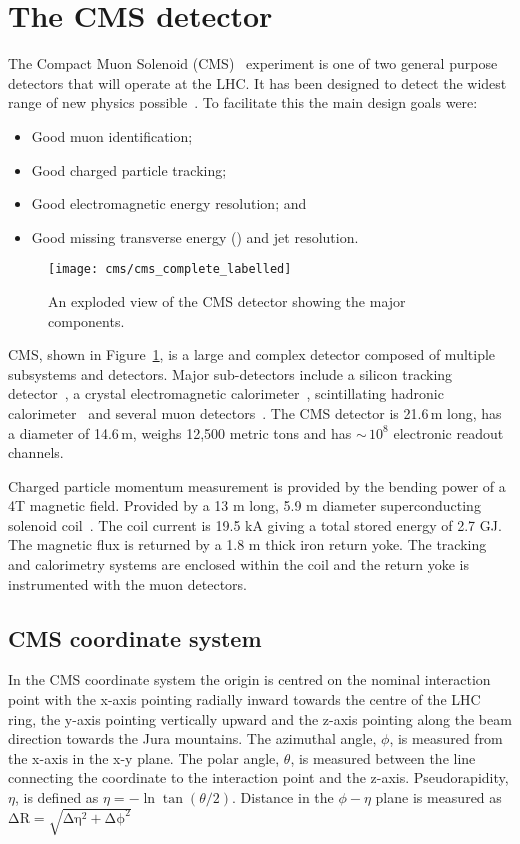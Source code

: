 \section{The CMS detector}
The Compact Muon Solenoid (CMS)~\cite{CMS_LOI,CMS_TP} experiment is one of two general purpose detectors that will operate at the LHC. It has been designed to detect the widest range of new physics possible~\cite{CMS_TDR_PHYS_vol1, CMS_TDR_PHYS_vol2}. To facilitate this the main design goals were:
\begin{itemize}
\item Good muon identification;
\item Good charged particle tracking;
\item Good electromagnetic energy resolution; and
\item Good missing transverse energy (\MET) and jet resolution.
\end{itemize}

\begin{figure}[!htb]
  \centering
  \texttt{[image: cms/cms\_complete\_labelled]}
  \caption{An exploded view of the CMS detector showing the major components.~\cite{CMS_TDR_PHYS_vol1}
  \label{fig:cms}}
\end{figure}

CMS, shown in Figure~\ref{fig:cms}, is a large and complex detector composed of multiple subsystems and detectors. Major sub-detectors include a silicon tracking detector~\cite{CMS_TRKTDR}, a crystal electromagnetic calorimeter~\cite{CMS_ECALTDR}, scintillating hadronic calorimeter~\cite{CMS_HCALTDR} and several muon detectors~\cite{CMS_MUONTDR}. The CMS detector is 21.6\,m long, has a diameter of 14.6\,m, weighs 12,500 metric tons and has $\sim\,10^{8}$ electronic readout channels. 

Charged particle momentum measurement is provided by the bending power of a 4T magnetic field. Provided by a 13 m long, 5.9 m diameter superconducting solenoid coil~\cite{CMS_MAGTDR}. The coil current is 19.5 kA giving a total stored energy of 2.7 GJ. The magnetic flux is returned by a 1.8 m thick iron return yoke. The tracking and calorimetry systems are enclosed within the coil and the return yoke is instrumented with the muon detectors.

\subsection{CMS coordinate system}
In the CMS coordinate system the origin is centred on the nominal interaction point with the x-axis pointing radially inward towards the centre of the LHC ring, the y-axis pointing vertically upward and the z-axis pointing along the beam direction towards the Jura mountains. The azimuthal angle, $\phi$, is measured from the x-axis in the x-y plane. The polar angle, $\theta$, is measured between the line connecting the coordinate to the interaction point and the z-axis. Pseudorapidity, $\eta$, is defined as $\eta=-\ln\tan(\theta/2)$. Distance in the $\phi - \eta$ plane is measured as $\mathrm{\Delta R = \sqrt{\Delta \eta^{2} + \Delta \phi^{2}}}$

